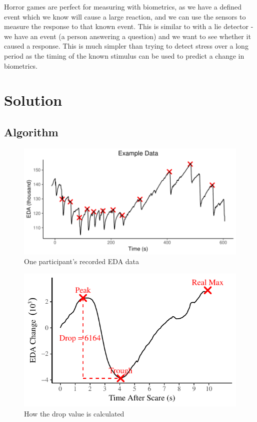 \documentclass[12pt,a4paper]{article}\usepackage[]{graphicx}\usepackage[]{color}
\makeatletter
\def\maxwidth{ %
  \ifdim\Gin@nat@width>\linewidth
    \linewidth
  \else
    \Gin@nat@width
  \fi
}
\makeatother
\begin{document}
Horror games are perfect for measuring with biometrics, as we have a defined event which we know will cause a large reaction, and we can use the sensors to measure the response to that known event. This is similar to with a lie detector - we have an event (a person answering a question) and we want to see whether it caused a response. This is much simpler than trying to detect stress over a long period as the timing of the known stimulus can be used to predict a change in biometrics.

\section{Solution}

\subsection{Algorithm}

\begin{figure}[htb]


{\centering \includegraphics[width=\maxwidth]{figure/ExampleEda-1} 

}



\caption{One participant's recorded EDA data}
\label{fig:ExampleEda}
\end{figure}

\begin{figure}[htb]


{\centering \includegraphics[width=\maxwidth]{figure/ExampleScare-1} 

}



\caption{How the drop value is calculated}
\label{fig:ExampleScare}
\end{figure}
\end{document}
